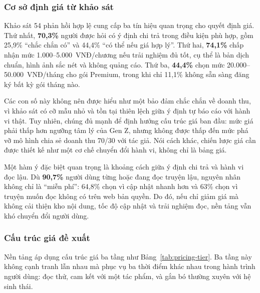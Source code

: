 \subsubsection{Cơ sở định giá từ khảo sát}

Khảo sát 54 phản hồi hợp lệ cung cấp ba tín hiệu quan trọng cho quyết định giá. Thứ nhất, \textbf{70{,}3\%} người được hỏi có ý định chi trả trong điều kiện phù hợp, gồm 25{,}9\% ``chắc chắn có'' và 44{,}4\% ``có thể nếu giá hợp lý''. Thứ hai, \textbf{74{,}1\%} chấp nhận mức 1.000--5.000~VNĐ/chương nếu trải nghiệm đủ tốt, cụ thể là bản dịch chuẩn, hình ảnh sắc nét và không quảng cáo. Thứ ba, \textbf{44{,}4\%} chọn mức 20.000--50.000~VNĐ/tháng cho gói Premium, trong khi chỉ 11{,}1\% không sẵn sàng đăng ký bất kỳ gói tháng nào.

Các con số này không nên được hiểu như một bảo đảm chắc chắn về doanh thu, vì khảo sát có cỡ mẫu nhỏ và tồn tại thiên lệch giữa ý định tự báo cáo với hành vi thật. Tuy nhiên, chúng đủ mạnh để định hướng cấu trúc giá ban đầu: mức giá phải thấp hơn ngưỡng tâm lý của Gen Z, nhưng không được thấp đến mức phá vỡ mô hình chia sẻ doanh thu 70/30 với tác giả. Nói cách khác, chiến lược giá cần được thiết kế như một cơ chế chuyển đổi hành vi, không chỉ là bảng giá.

Một hàm ý đặc biệt quan trọng là khoảng cách giữa ý định chi trả và hành vi đọc lậu. Dù \textbf{90{,}7\%} người dùng từng hoặc đang đọc truyện lậu, nguyên nhân không chỉ là ``miễn phí'': 64{,}8\% chọn vì cập nhật nhanh hơn và 63\% chọn vì truyện muốn đọc không có trên web bản quyền. Do đó, nếu chỉ giảm giá mà không cải thiện kho nội dung, tốc độ cập nhật và trải nghiệm đọc, nền tảng vẫn khó chuyển đổi người dùng.

\subsubsection{Cấu trúc giá đề xuất}

Nền tảng áp dụng cấu trúc giá ba tầng như Bảng~\ref{tab:pricing-tier}. Ba tầng này không cạnh tranh lẫn nhau mà phục vụ ba thời điểm khác nhau trong hành trình người dùng: đọc thử, cam kết với một tác phẩm, và gắn bó thường xuyên với hệ sinh thái.

